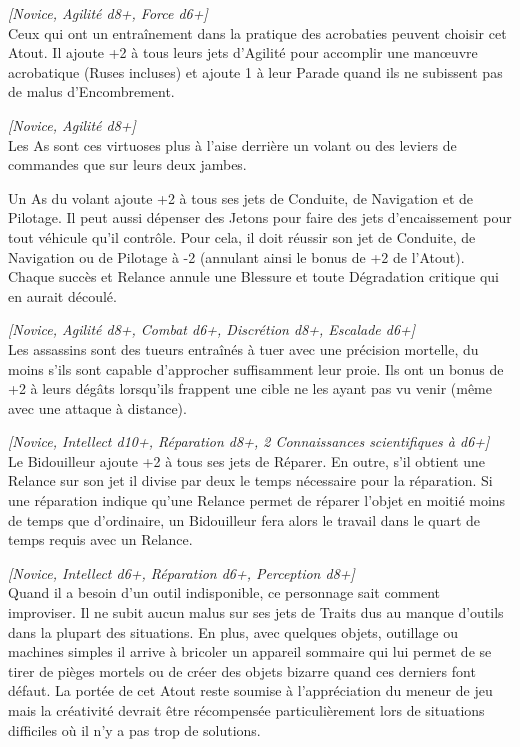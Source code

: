 \begin{description}[align=left]

    \item [Acrobate]
        \emph{[Novice, Agilité d8+, Force d6+]}\\
        Ceux qui ont un entraînement dans la pratique des acrobaties peuvent choisir cet Atout. Il ajoute +2 à tous leurs jets d’Agilité pour accomplir une man\oe{uvre} acrobatique (Ruses incluses) et ajoute 1 à leur Parade quand ils ne subissent pas de malus d’Encombrement.

    \item [As du volant]
        \emph{[Novice, Agilité d8+]}\\
        Les As sont ces virtuoses plus à l’aise derrière un volant ou des leviers de commandes que sur leurs deux jambes.

        Un As du volant ajoute +2 à tous ses jets de Conduite, de Navigation et de Pilotage. Il peut aussi dépenser des Jetons pour faire des jets d’encaissement pour tout véhicule qu’il contrôle. Pour cela, il doit réussir son jet de Conduite, de Navigation ou de Pilotage à -2 (annulant ainsi le bonus de +2 de l’Atout). Chaque succès et Relance annule une Blessure et toute Dégradation critique qui en aurait découlé.

    \item [Assassin]
        \emph{[Novice, Agilité d8+, Combat d6+, Discrétion d8+, Escalade d6+]}\\
        Les assassins sont des tueurs entraînés à tuer avec une précision mortelle, du moins s’ils sont capable d’approcher suffisamment leur proie. Ils ont un bonus de +2 à leurs dégâts lorsqu’ils frappent une cible ne les ayant pas vu venir (même avec une attaque à distance).

    \item [Bidouilleur]
        \emph{[Novice, Intellect d10+, Réparation d8+, 2 Connaissances scientifiques à d6+]}\\
        Le Bidouilleur ajoute +2 à tous ses jets de Réparer. En outre, s’il obtient une Relance sur son jet il divise par deux le temps nécessaire pour la réparation. Si une réparation indique qu’une Relance permet de réparer l’objet en moitié moins de temps que d’ordinaire, un Bidouilleur fera alors le travail dans le quart de temps requis avec un Relance.

    \item [Débrouillard]
        \emph{[Novice, Intellect d6+, Réparation d6+, Perception d8+]}\\
        Quand il a besoin d’un outil indisponible, ce personnage sait comment improviser. Il ne subit aucun malus sur ses jets de Traits dus au manque d’outils dans la plupart des situations. En plus, avec quelques objets, outillage ou machines simples il arrive à bricoler un appareil sommaire qui lui permet de se tirer de pièges mortels ou de créer des objets bizarre quand ces derniers font défaut. La portée de cet Atout reste soumise à l’appréciation du meneur de jeu mais la créativité devrait être récompensée particulièrement lors de situations difficiles où il n’y a pas trop de solutions.


\end{description}
